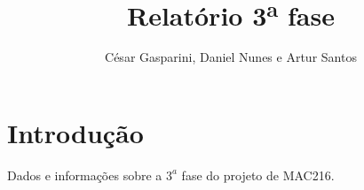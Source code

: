 \documentclass[a4paper]{article}
\title{\textbf{Relatório 3\textsuperscript{a} fase}}
\author{César Gasparini, Daniel Nunes e Artur Santos}
\date{}
\begin{document}
\maketitle

\section{Introdução}
Dados e informações sobre a $3^{a}$ fase do projeto de MAC216.
\end{document}
